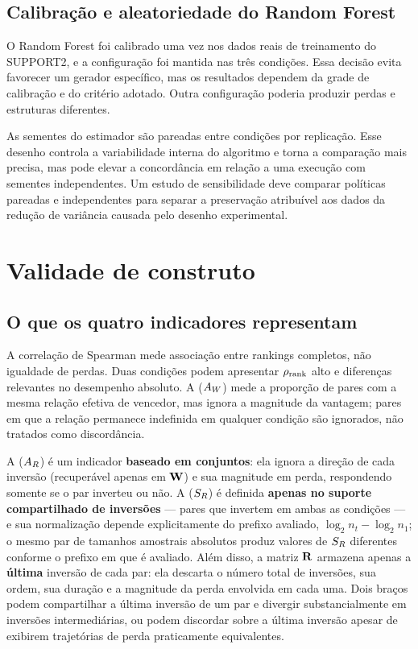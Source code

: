 \subsection{Calibração e aleatoriedade do Random Forest}

O Random Forest foi calibrado uma vez nos dados reais de treinamento do SUPPORT2, e a configuração foi mantida nas três condições. Essa decisão evita favorecer um gerador específico, mas os resultados dependem da grade de calibração e do critério adotado. Outra configuração poderia produzir perdas e estruturas diferentes.

As sementes do estimador são pareadas entre condições por replicação. Esse desenho controla a variabilidade interna do algoritmo e torna a comparação mais precisa, mas pode elevar a concordância em relação a uma execução com sementes independentes. Um estudo de sensibilidade deve comparar políticas pareadas e independentes para separar a preservação atribuível aos dados da redução de variância causada pelo desenho experimental.

\section{Validade de construto}

\subsection{O que os quatro indicadores representam}

A correlação de Spearman mede associação entre rankings completos, não igualdade de perdas. Duas condições podem apresentar $\rho_{\mathrm{rank}}$ alto e diferenças relevantes no desempenho absoluto. A \WinnersAgreement{} ($A_W$) mede a proporção de pares com a mesma relação efetiva de vencedor, mas ignora a magnitude da vantagem; pares em que a relação permanece indefinida em qualquer condição são ignorados, não tratados como discordância.

A \ReversalExistenceAgreement{} ($A_R$) é um indicador \textbf{baseado em conjuntos}: ela ignora a direção de cada inversão (recuperável apenas em $\mathbf{W}$) e sua magnitude em perda, respondendo somente se o par inverteu ou não. A \ReversalSampleSizeSimilarity{} ($S_R$) é definida \textbf{apenas no suporte compartilhado de inversões} --- pares que invertem em ambas as condições --- e sua normalização depende explicitamente do prefixo avaliado, $\log_2 n_t-\log_2 n_1$; o mesmo par de tamanhos amostrais absolutos produz valores de $S_R$ diferentes conforme o prefixo em que é avaliado. Além disso, a matriz $\mathbf{R}$ armazena apenas a \textbf{última} inversão de cada par: ela descarta o número total de inversões, sua ordem, sua duração e a magnitude da perda envolvida em cada uma. Dois braços podem compartilhar a última inversão de um par e divergir substancialmente em inversões intermediárias, ou podem discordar sobre a última inversão apesar de exibirem trajetórias de perda praticamente equivalentes.

